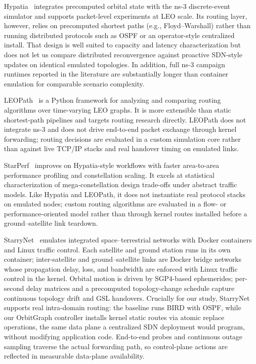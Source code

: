 Hypatia~\cite{kassing2020exploring} integrates precomputed orbital state with
the ns-3 discrete-event simulator and supports packet-level experiments at LEO
scale.
Its routing layer, however, relies on precomputed shortest paths (e.g.,
Floyd--Warshall) rather than running distributed protocols such as OSPF or an
operator-style centralized install.
That design is well suited to capacity and latency characterization but does
not let us compare distributed reconvergence against proactive SDN-style
updates on identical emulated topologies.
In addition, full ns-3 campaign runtimes reported in the literature are
substantially longer than container emulation for comparable scenario
complexity.

LEOPath~\cite{leopath2024} is a Python framework for analyzing and comparing
routing algorithms over time-varying LEO graphs.
It is more extensible than static shortest-path pipelines and targets routing
research directly.
LEOPath does not integrate ns-3 and does not drive end-to-end packet exchange
through kernel forwarding; routing decisions are evaluated in a custom
simulation core rather than against live TCP/IP stacks and real handover
timing on emulated links.

StarPerf~\cite{lai2020starperf} improves on Hypatia-style workflows with faster
area-to-area performance profiling and constellation scaling.
It excels at statistical characterization of mega-constellation design
trade-offs under abstract traffic models.
Like Hypatia and LEOPath, it does not instantiate real protocol stacks on
emulated nodes; custom routing algorithms are evaluated in a flow- or
performance-oriented model rather than through kernel routes installed before
a ground--satellite link teardown.

StarryNet~\cite{lai2023starrynet} emulates integrated space--terrestrial
networks with Docker containers and Linux traffic control.
Each satellite and ground station runs in its own container; inter-satellite
and ground--satellite links are Docker bridge networks whose propagation delay,
loss, and bandwidth are enforced with Linux traffic control in the kernel.
Orbital motion is driven by SGP4-based ephemerides; per-second delay matrices
and a precomputed topology-change schedule capture continuous topology drift
and GSL handovers.
Crucially for our study, StarryNet supports real intra-domain routing:
the baseline runs BIRD with OSPF, while our OrbitGraph controller installs
kernel static routes via atomic replace operations, the same data plane a
centralized SDN deployment would program, without modifying application code.
End-to-end probes and continuous outage sampling traverse the actual
forwarding path, so control-plane actions are reflected in measurable
data-plane availability.

